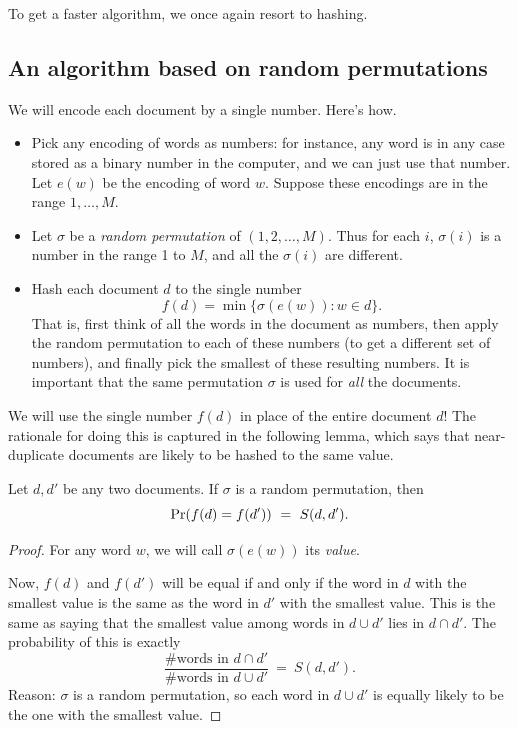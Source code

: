 To get a faster algorithm, we once again resort to hashing.

\subsection{An algorithm based on random permutations}

We will encode each document by a single number. Here's how.
\begin{itemize}
\item Pick any encoding of words as numbers: for instance, any word is in any case stored
as a binary number in the computer, and we can just use that number. Let $e(w)$ be the encoding
of word $w$. Suppose these encodings are in the range $1,\ldots, M$.
\item Let $\sigma$ be a {\it random permutation} of $(1,2,\ldots, M)$. Thus for each $i$, 
$\sigma(i)$ is a number in the range 1 to $M$, and all the $\sigma(i)$ are different.
\item Hash each document $d$ to the single number
$$ f(d) = \min \{\sigma(e(w)): w \in d\} .$$
That is, first think of all the words in the document as numbers, then apply the random 
permutation to each of these numbers (to get a different set of numbers), and finally pick
the smallest of these resulting numbers. It is important that the same permutation $\sigma$
is used for {\it all} the documents.
\end{itemize}

We will use the single number $f(d)$ in place of the entire document $d$! The rationale for doing 
this is captured in the following lemma, which says that near-duplicate documents are likely to
be hashed to the same value.
\begin{lemma}
Let $d,d'$ be any two documents. If $\sigma$ is a random permutation, then
$$ \mbox{\rm Pr}(f(d) = f(d')) \ = \ S(d,d') .$$
\end{lemma}
\begin{proof}
For any word $w$, we will call $\sigma(e(w))$ its {\it value}.

Now, $f(d)$ and $f(d')$ will be equal if and only if the word in $d$ with the
smallest value is the same as the word in $d'$ with the smallest value. This is the same 
as saying that the smallest value among words in $d \cup d'$ lies in $d \cap d'$. The 
probability of this is exactly
$$ \frac{\mbox{\# words in $d \cap d'$}}{\mbox{\# words in $d \cup d'$}} \ = \ S(d,d').$$
Reason: $\sigma$ is a random permutation, so each word in $d \cup d'$ is equally likely to 
be the one with the smallest value.
\end{proof}

